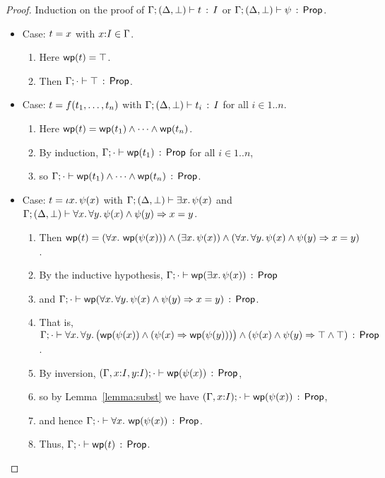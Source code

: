 \documentclass[10pt,a4paper]{article}
\begin{document}
\begin{proof}
  \raggedright Induction on the proof of
  $\Gamma;(\Delta,\bot) \vdash t\, :\, I$ or $\Gamma;(\Delta,\bot) \vdash \psi\, :\, \mathsf{Prop}$.
  \begin{itemize}
  \item Case: $t = x$ with $x{:}I\in\Gamma$.  
    \begin{enumerate}
      \item
        Here $\mathop{\mathsf{wp}}(t) = \top$.
      \item
        Then $\Gamma;\cdot \vdash \top\, :\, \mathsf{Prop}$. 
      \end{enumerate}
  \item Case: $t = f({t}_1,\ldots,{t}_{n})$ with
    $\Gamma;(\Delta,\bot) \vdash t_i\, :\, I$ for all $i\in1..n$.
    \begin{enumerate}
    \item
      Here $\mathop{\mathsf{wp}}(t) =
      \mathop{\mathsf{wp}}(t_1) \wedge \cdots \wedge \mathop{\mathsf{wp}}(t_n)$.
    \item 
    	By induction,
      $\Gamma;\cdot \vdash \mathop{\mathsf{wp}}(t_1)\, :\, \mathsf{Prop}$ for
      all $i\in1..n$, 
    \item 
    	so
    $\Gamma;\cdot \vdash \mathop{\mathsf{wp}}(t_1) \wedge \cdots \wedge \mathop{\mathsf{wp}}(t_n)\, :\, \mathsf{Prop}$.
    \end{enumerate}
        
  \item Case: $t = \iota x.\, \psi(x)$ with
  $\Gamma;(\Delta,\bot) \vdash \exists x.\, \psi(x)$ and 
  $\Gamma;(\Delta,\bot) \vdash \forall x.\, \forall y.\, \psi(x) \wedge \psi(y) \Rightarrow x=y$.

    \begin{enumerate}
      \item 
        Then
        $\mathop{\mathsf{wp}}(t) = 
        (\forall x.\, \mathop{\mathsf{wp}}(\psi(x))) \wedge (\exists x.\, \psi(x)) \wedge (\forall x.\, \forall y.\, \psi(x) \wedge \psi(y) \Rightarrow x=y)$.
      \item 
        By the inductive hypothesis, $\Gamma;\cdot \vdash \mathop{\mathsf{wp}}(\exists x.\, \psi(x))\, :\, \mathsf{Prop}$
      \item 
      	and
        $\Gamma;\cdot \vdash \mathop{\mathsf{wp}}(\forall x.\, \forall y.\, \psi(x) \wedge \psi(y) \Rightarrow x=y)\, :\, \mathsf{Prop}$.
      \item
      	That is, 
	$\Gamma;\cdot \vdash \forall x.\, \forall y.\, \bigl(\mathop{\mathsf{wp}}(\psi(x)) \wedge (\psi(x) \Rightarrow \mathop{\mathsf{wp}}(\psi(y)))\bigr) \wedge (\psi(x) \wedge \psi(y) \Rightarrow \top \wedge \top)\, :\, \mathsf{Prop}$.
	  \item
	    By inversion, 
	      $(\Gamma,x{:}I,y{:}I);\cdot \vdash \mathop{\mathsf{wp}}(\psi(x))\, :\, \mathsf{Prop}$,
      \item 
        so by Lemma~\ref{lemma:subst} we have 
        $(\Gamma,x{:}I);\cdot \vdash \mathop{\mathsf{wp}}(\psi(x))\, :\, \mathsf{Prop}$,
      \item
        and hence $\Gamma;\cdot \vdash \forall x.\, \mathop{\mathsf{wp}}(\psi(x))\, :\, \mathsf{Prop}$.
      \item
        Thus, $\Gamma;\cdot \vdash \mathop{\mathsf{wp}}(t)\, :\, \mathsf{Prop}$.
      \end{enumerate}
      

\end{itemize}
\end{proof}
\end{document}
